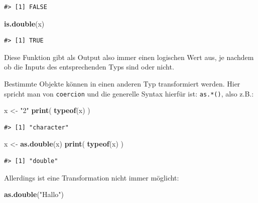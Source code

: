 \documentclass[]{book}
\newenvironment{Shaded}{\begin{snugshade}}{\end{snugshade}}
\newcommand{\KeywordTok}[1]{\textcolor[rgb]{0.13,0.29,0.53}{\textbf{#1}}}
\newcommand{\StringTok}[1]{\textcolor[rgb]{0.31,0.60,0.02}{#1}}
\newcommand{\NormalTok}[1]{#1}
\begin{document}
\begin{verbatim}
#> [1] FALSE
\end{verbatim}

\begin{Shaded}
\begin{Highlighting}[]
\KeywordTok{is.double}\NormalTok{(x)}
\end{Highlighting}
\end{Shaded}

\begin{verbatim}
#> [1] TRUE
\end{verbatim}

Diese Funktion gibt als Output also immer einen logischen Wert aus, je
nachdem ob die Inputs des entsprechenden Typs sind oder nicht.

Bestimmte Objekte können in einen anderen Typ transformiert werden. Hier
spricht man von \texttt{coercion} und die generelle Syntax hierfür ist:
\texttt{as.*()}, also z.B.:

\begin{Shaded}
\begin{Highlighting}[]
\NormalTok{x <-}\StringTok{ "2"}
\KeywordTok{print}\NormalTok{(}
  \KeywordTok{typeof}\NormalTok{(x)}
\NormalTok{)}
\end{Highlighting}
\end{Shaded}

\begin{verbatim}
#> [1] "character"
\end{verbatim}

\begin{Shaded}
\begin{Highlighting}[]
\NormalTok{x <-}\StringTok{ }\KeywordTok{as.double}\NormalTok{(x)}
\KeywordTok{print}\NormalTok{(}
  \KeywordTok{typeof}\NormalTok{(x)}
\NormalTok{)}
\end{Highlighting}
\end{Shaded}

\begin{verbatim}
#> [1] "double"
\end{verbatim}

Allerdings ist eine Transformation nicht immer möglicht:

\begin{Shaded}
\begin{Highlighting}[]
\KeywordTok{as.double}\NormalTok{(}\StringTok{"Hallo"}\NormalTok{)}
\end{Highlighting}
\end{Shaded}
\end{document}
